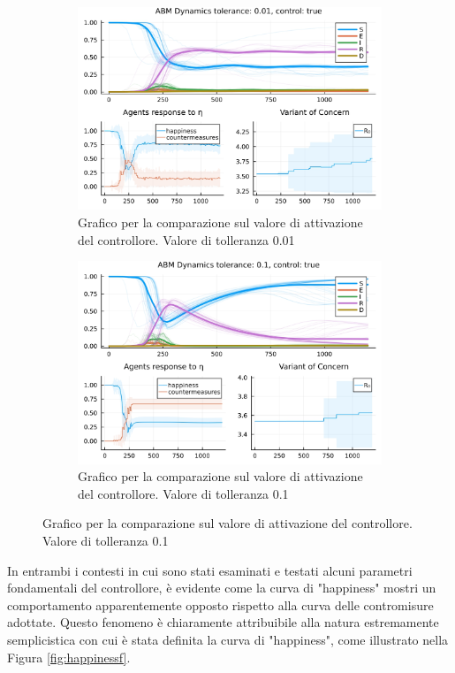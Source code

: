 \begin{figure}[!hb]
\begin{subfigure}[b]{0.45\textwidth}
		\includegraphics[width=\textwidth]{img/SocialNetworkABM_3_TOL.jpg}
		\caption{Grafico per la comparazione sul valore di attivazione del controllore. Valore di tolleranza 0.01}
		\label{fig:comparison_tol_1e-2}
	\end{subfigure}
	\hfill
	\begin{subfigure}[b]{0.45\textwidth}
		\centering
		\includegraphics[width=\textwidth]{img/SocialNetworkABM_4_TOL.jpg}
		\caption{Grafico per la comparazione sul valore di attivazione del controllore. Valore di tolleranza 0.1}
		\label{fig:comparison_tol_1e-1}
	\end{subfigure}
\end{figure}

In entrambi i contesti in cui sono stati esaminati e testati alcuni 
parametri fondamentali del controllore, è evidente come la curva di 
"happiness" mostri un comportamento apparentemente opposto rispetto alla 
curva delle contromisure adottate. Questo fenomeno è chiaramente 
attribuibile alla natura estremamente semplicistica con cui è stata 
definita la curva di "happiness", come illustrato nella Figura 
\ref{fig:happinessf}.

